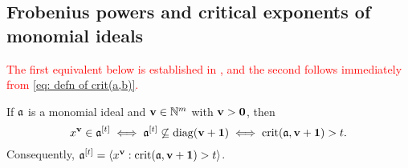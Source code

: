 \documentclass{amsart}
\begin{document}
{\subsection{Frobenius powers and critical exponents of monomial ideals}

%
%

\textcolor{red}{The first equivalent below is established in \cite[Proposition 2.5]{hernandez+etal.frobenius_examples}, and the second follows immediately from \eqref{eq: defn of crit(a,b)}.}


\begin{proposition}\label{prop: description of frobenius powers in terms of crits}
   If $\mathfrak{a}$ is a monomial ideal and $\mathbf{v} \in \mathbb{N}^m$ with $\mathbf{v}>\mathbf{0}$, then
   \[ x^{\mathbf{v}} \in \mathfrak{a}^{[t]} \iff \mathfrak{a}^{[t]} \not \subseteq \operatorname{diag}(\mathbf{v}+\mathbf{1}) \iff \operatorname{crit}(\mathfrak{a}, \mathbf{v}+\mathbf{1}) > t.\]
   Consequently, $\mathfrak{a}^{[t]} = \langle x^{\mathbf{v}} : \operatorname{crit}(\mathfrak{a}, \mathbf{v}+\mathbf{1}) > t \rangle$.
\end{proposition}



}
\end{document}
